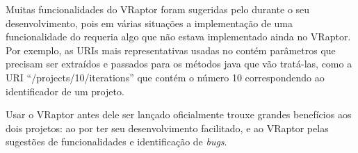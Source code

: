 Muitas funcionalidades do VRaptor foram sugeridas pelo \calopsita{} durante o seu desenvolvimento, pois em várias situações a implementação de uma funcionalidade do \calopsita{} requeria algo que não estava implementado ainda no VRaptor. Por exemplo, as URIs mais representativas usadas no \calopsita{} contém parâmetros que precisam ser extraídos e passados para os métodos java que vão tratá-las, como a URI ``/projects/10/iterations'' que contém o número 10 correspondendo ao identificador de um projeto.

Usar o VRaptor antes dele ser lançado oficialmente trouxe grandes benefícios aos dois projetos: ao \calopsita{} por ter seu desenvolvimento facilitado, e ao VRaptor pelas sugestões de funcionalidades e identificação de \textit{bugs}.
